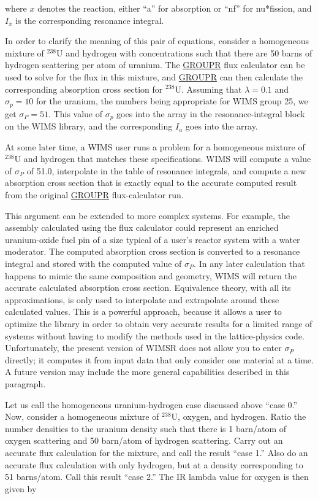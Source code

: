 \noindent
where $x$ denotes the reaction, either ``a'' for absorption or
``nf'' for nu*fission, and $I_x$ is the corresponding resonance integral.

In order to clarify the meaning of this pair of equations, consider
a homogeneous mixture of $^{238}$U and hydrogen with concentrations
such that there are 50 barns of hydrogen scattering per atom of
uranium.  The \hyperlink{sGROUPRhy}{GROUPR} flux
calculator can be used to solve for the
flux in this mixture, and
\hyperlink{sGROUPRhy}{GROUPR} can then calculate the corresponding
absorption cross section for $^{238}$U.  Assuming that $\lambda=0.1$
and $\sigma_p=10$ for the uranium, the numbers being appropriate
for WIMS group 25, we get $\sigma_P=51$.  This value of $\sigma_p$
goes into the  array in the resonance-integral block on
the WIMS library, and the corresponding $I_a$ goes into the
 array.

At some later time, a WIMS user runs a problem for a homogeneous
mixture of $^{238}$U and hydrogen that matches these specifications.
WIMS will compute a value of $\sigma_P$ of 51.0, interpolate
in the table of resonance integrals, and compute a new absorption
cross section that is exactly equal to the accurate computed result
from the original \hyperlink{sGROUPRhy}{GROUPR} flux-calculator run.

This argument can be extended to more complex systems.  For example,
the assembly calculated using the flux calculator could represent
an enriched uranium-oxide fuel pin of a size typical of a user's
reactor system with a water moderator.  The computed absorption
cross section is converted to a resonance integral and stored with
the computed value of $\sigma_P$.  In any later calculation that
happens to mimic the same composition and geometry, WIMS will
return the accurate calculated absorption cross section.  Equivalence
theory, with all its approximations, is only
used to interpolate and extrapolate around these calculated values.
This is a powerful approach, because it allows a user to optimize the
library in order to obtain very accurate results for a limited range
of systems without having to modify the methods used in the
lattice-physics code.  Unfortunately, the present version of WIMSR
does not allow you to enter $\sigma_P$ directly; it computes it
from input data that only consider one material at a time.  A future
version may include the more general capabilities described in
this paragraph.

Let us call the homogeneous uranium-hydrogen case discussed above
``case 0.''  Now, consider a homogeneous mixture of $^{238}$U, oxygen,
and hydrogen.  Ratio the number densities to the uranium density such
that there is 1 barn/atom of oxygen scattering and 50 barn/atom of hydrogen
scattering.    Carry out an accurate flux calculation for the mixture, and
call the result ``case 1.''  Also do an accurate flux calculation with only
hydrogen,  but at a density corresponding to 51 barns/atom. Call this result
``case 2.''  The IR lambda value for oxygen is then given by

